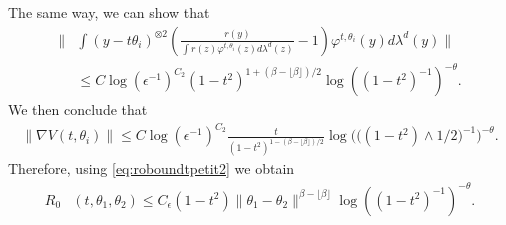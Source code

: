 \documentclass{article}
\begin{document}
The same way, we can show that
\begin{align*}
    \|&\int\left(y-t\theta_i\right)^{\otimes2}\left( \frac{r(y)}{\int r(z)\varphi^{t,\theta_i}(z)d\lambda^d(z)}-1\right)\varphi^{t,\theta_i}(y)d\lambda^d(y)\|\\
    &\leq C\log(\epsilon^{-1})^{C_2}(1-t^2)^{1+(\beta-\lfloor \beta \rfloor)/2}\log((1-t^2)^{-1})^{-\theta}.
\end{align*}
We then conclude that
\begin{align}\label{align:estimatenablatgrand}
    \|\nabla V(t,\theta_i)\|\leq C\log(\epsilon^{-1})^{C_2} \frac{t}{(1-t^2)^{1-(\beta-\lfloor \beta \rfloor)/2}}\log\Big(\big((1-t^2)\wedge 1/2\big)^{-1}\Big)^{-\theta}.
\end{align}
Therefore, using \eqref{eq:roboundtpetit2} we obtain
\begin{align*}
    R_0&(t,\theta_1,\theta_2)\leq C_\epsilon (1-t^2)\|\theta_1-\theta_2\|^{\beta-\lfloor \beta \rfloor}\log((1-t^2)^{-1})^{-\theta}.
\end{align*}
\end{document}
